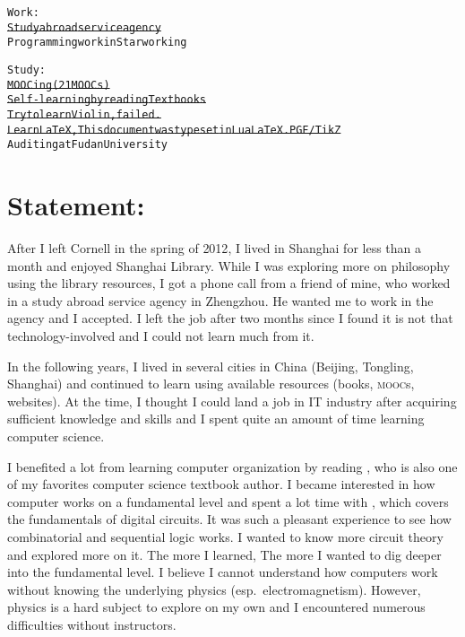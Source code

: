 


\usepackage[font={scriptsize,it}]{caption}
\usepackage{metalogo,alltt,soul,tikz,standalone,wrapfig,csquotes}
\usetikzlibrary{calc}
\usepackage{biblatex} %



\newcommand*{\onum}[1]{{\addfontfeatures{Numbers=OldStyle}#1}}
\newcommand*{\TikZ}{PGF/\kern1bpTi\kern.5bp\textit{k}Z}


	\begin{alltt}
		Work:
		\st{Study abroad service agency}
		Programming work in Starworking
		
		Study:
		\st{MOOCing (21 MOOCs)}
		\st{Self-learning by reading Textbooks}
		\st{Try to learn Violin, failed.}
		\st{Learn LaTeX, This document was typeset in LuaLaTeX. PGF/TikZ}
		Auditing at Fudan University
	\end{alltt}
	
	\section*{Statement:}
	After I left Cornell in the spring of \onum{2012}, I lived in Shanghai for less
	than a month and enjoyed Shanghai Library. While I was exploring more on
	philosophy using the library resources, I got a phone call from a friend of
	mine, who worked in a study abroad service agency in Zhengzhou. He wanted me to
	work in the agency and I accepted. I left the job after two months since I
	found it is not that technology-involved and I could not learn much from it.
	
	In the following years, I lived in several cities in China (Beijing, Tongling,
	Shanghai) and continued to learn using available resources (books, \textsc{mooc}s,
	websites). At the time, I thought I could land a job in IT industry after
	acquiring sufficient knowledge and skills and I spent quite an amount of time
	learning computer science.
	
	I benefited a lot from learning computer organization by reading
	\textcite{COA8e}, who is also one of my favorites computer science textbook
	author. I became interested in how computer works on a fundamental level and
	spent a lot time with \textcite{LCDF}, which covers the fundamentals of digital
	circuits. It was such a pleasant experience to see how combinatorial and
	sequential logic works. I wanted to know more circuit theory and explored more
	on it. The more I learned, The more I wanted to dig deeper into the fundamental
	level. I believe I cannot understand how computers work without knowing the
	underlying physics (esp.\ electromagnetism). However, physics is a hard subject
	to explore on my own and I encountered numerous difficulties without
	instructors.
	
